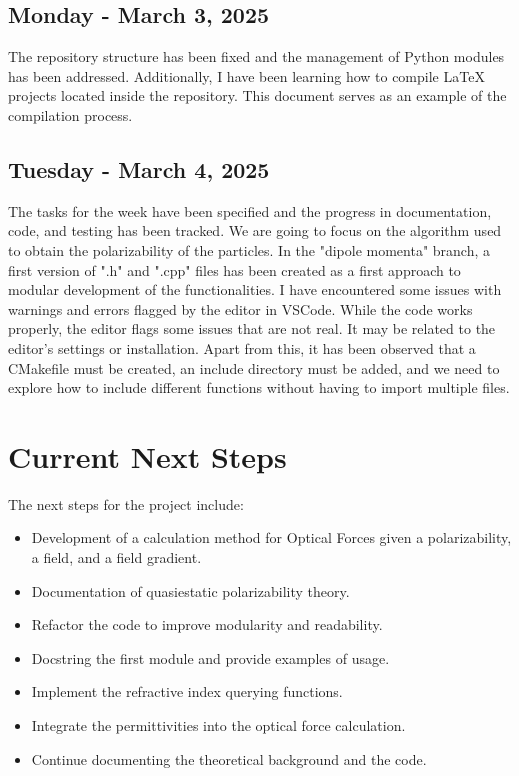 \documentclass{article}
\begin{document}
\subsection{Monday - March 3, 2025}
The repository structure has been fixed and the management of Python modules has been addressed.
Additionally, I have been learning how to compile LaTeX projects located inside the repository.
This document serves as an example of the compilation process.

\subsection{Tuesday - March 4, 2025}
The tasks for the week have been specified and the progress in documentation, code, and testing has been tracked.
We are going to focus on the algorithm used to obtain the polarizability of the particles. In the "dipole momenta" branch,
a first version of ".h" and ".cpp" files has been created as a first approach to modular development of the functionalities.
I have encountered some issues with warnings and errors flagged by the editor in VSCode. While the code works properly, the editor
flags some issues that are not real. It may be related to the editor's settings or installation.
Apart from this, it has been observed that a CMakefile must be created, an include directory must be added,
and we need to explore how to include different functions without having to import multiple files.

\section{Current Next Steps}
The next steps for the project include:
\begin{itemize}
    \item Development of a calculation method for Optical Forces given a polarizability, a field, and a field gradient.
    \item Documentation of quasiestatic polarizability theory.
    \item Refactor the code to improve modularity and readability.
    \item Docstring the first module and provide examples of usage.
    \item Implement the refractive index querying functions.
    \item Integrate the permittivities into the optical force calculation.
    \item Continue documenting the theoretical background and the code.

\end{itemize}
\end{document}
